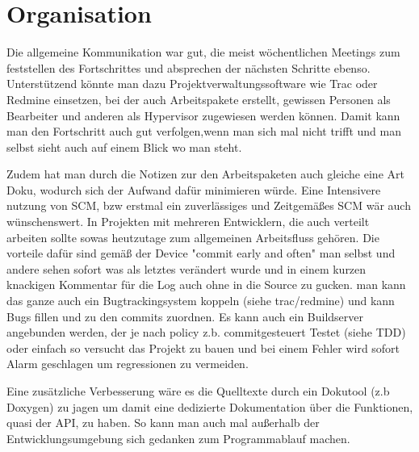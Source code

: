 \section{Organisation}

Die allgemeine Kommunikation war gut, die meist w\"ochentlichen Meetings zum feststellen des Fortschrittes und absprechen der n\"achsten Schritte ebenso. Unterst\"utzend k\"onnte man dazu Projektverwaltungssoftware wie Trac oder Redmine einsetzen, bei der auch Arbeitspakete erstellt, gewissen Personen als Bearbeiter und anderen als Hypervisor zugewiesen werden k\"onnen. Damit kann man den Fortschritt auch gut verfolgen,wenn man sich mal nicht trifft und man selbst sieht auch auf einem Blick wo man steht.

Zudem hat man durch die Notizen zur den Arbeitspaketen auch gleiche eine Art Doku, wodurch sich der Aufwand daf\"ur minimieren w\"urde.
Eine Intensivere nutzung von SCM,  bzw erstmal ein zuverl\"assiges und Zeitgem\"a{\ss}es SCM w\"ar auch w\"unschenswert. In Projekten mit mehreren Entwicklern, die auch verteilt arbeiten sollte sowas heutzutage zum allgemeinen Arbeitsfluss geh\"oren. 
Die vorteile daf\"ur sind  gem\"a{\ss} der Device "commit early and often" man selbst und andere sehen sofort was als letztes ver\"andert wurde und in einem kurzen knackigen Kommentar f\"ur die Log auch ohne in die Source zu gucken. man kann das ganze auch ein Bugtrackingsystem koppeln (siehe trac/redmine) und kann Bugs fillen und zu den commits zuordnen. Es kann auch ein Buildserver angebunden werden, der je nach policy  z.b. commitgesteuert Testet (siehe TDD) oder einfach so versucht das Projekt zu bauen und bei einem Fehler wird sofort Alarm geschlagen um regressionen zu vermeiden.

Eine zus\"atzliche Verbesserung w\"are es die Quelltexte durch ein Dokutool (z.b Doxygen) zu jagen um damit eine dedizierte Dokumentation \"uber die Funktionen, quasi der API, zu haben. So kann man auch mal au{\ss}erhalb der Entwicklungsumgebung sich gedanken zum Programmablauf machen.